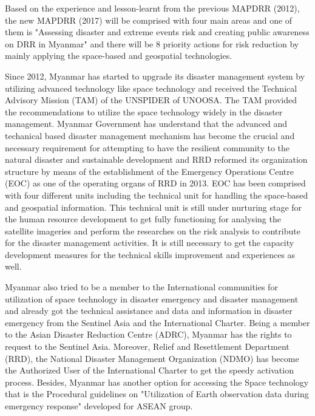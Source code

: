 {\vspace{0.4 cm}
  
Based on the experience and lesson-learnt from the previous MAPDRR (2012), the new MAPDRR (2017) will be comprised with four main areas and one of them is "Assessing disaster and extreme events risk and creating public awareness on DRR in Myanmar" and there will be 8 priority actions for risk reduction by mainly applying the space-based and geospatial  technologies. 
		
\vspace{0.4 cm}
  
Since 2012, Myanmar has started to upgrade its disaster management system by utilizing advanced technology like space technology and received the Technical Advisory Mission (TAM) of the UNSPIDER of UNOOSA. The TAM provided the recommendations to utilize the space technology widely in the disaster management. Myanmar Government has understand that the advanced and techanical based disaster management mechanism has become the crucial and necessary requirement for attempting to have the resilient community to the natural disaster and sustainable development and RRD reformed its organization structure by means of the establishment of the Emergency Operations Centre (EOC) as one of the operating organs of RRD in 2013. EOC has been comprised with four different units including the technical unit for handling the space-based and geospatial information. This technical unit is still under nurturing stage for the human resource development to get fully functioning for analysing the satellite imageries and perform the researches on the risk analysis to contribute for the disaster management activities. It is still necessary to get the capacity development measures for the technical skills improvement and experiences as well.
		
\vspace{0.4 cm}
  
Myanmar also tried to be a member to the International communities for utilization of space technology in disaster emergency and disaster management and already got the technical assistance and data and information in disaster emergency from the Sentinel Asia and the International Charter. Being a member to the Asian Disaster Reduction Centre (ADRC), Myanmar has the rights to request to the Sentinel Asia. Moreover, Relief and Resettlement Department (RRD), the National Disaster Management Organization (NDMO) has become the Authorized User of the International Charter to get the speedy activation process. Besides, Myanmar has another option for accessing the Space technology that is the Procedural guidelines on "Utilization of Earth observation data during emergency response" developed for ASEAN group.
		
}

